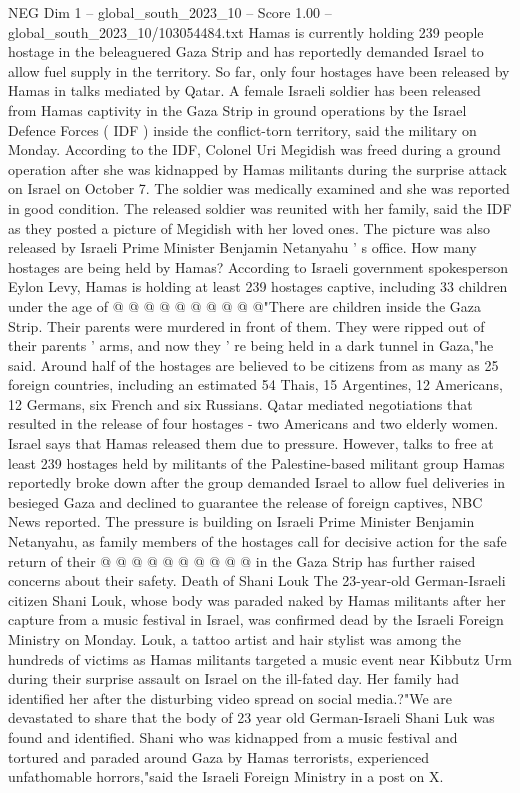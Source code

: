 \begin{textsample}{NEG Dim 1 – global\_south\_2023\_10 – Score 1.00 – global\_south\_2023\_10/103054484.txt}  \label{ex:f1_neg_398}
Hamas is currently holding 239 people hostage in the beleaguered Gaza Strip and has reportedly demanded Israel to allow fuel supply in the territory.
So far, only four hostages have been released by Hamas in talks mediated by Qatar.
A female Israeli soldier has been released from Hamas captivity in the Gaza Strip in ground operations by the Israel Defence Forces ( IDF ) inside the conflict-torn territory, said the military on Monday.
According to the IDF, Colonel Uri Megidish was freed during a ground operation after she was kidnapped by Hamas militants during the surprise attack on Israel on October 7.
The soldier was medically examined and she was reported in good condition.
The released soldier was reunited with her family, said the IDF as they posted a picture of Megidish with her loved ones.
The picture was also released by Israeli Prime Minister Benjamin Netanyahu ' s office.
How many hostages are being held by Hamas?
According to Israeli government spokesperson Eylon Levy, Hamas is holding at least 239 hostages captive, including 33 children under the age of @ @ @ @ @ @ @ @ @ @"There are children inside the Gaza Strip.
Their parents were murdered in front of them.
They were ripped out of their parents ' arms, and now they ' re being held in a dark tunnel in Gaza,"he said.
Around half of the hostages are believed to be citizens from as many as 25 foreign countries, including an estimated 54 Thais, 15 Argentines, 12 Americans, 12 Germans, six French and six Russians.
Qatar mediated negotiations that resulted in the release of four hostages - two Americans and two elderly women.
Israel says that Hamas released them due to pressure.
However, talks to free at least 239 hostages held by militants of the Palestine-based militant group Hamas reportedly broke down after the group demanded Israel to allow fuel deliveries in besieged Gaza and declined to guarantee the release of foreign captives, NBC News reported.
The pressure is building on Israeli Prime Minister Benjamin Netanyahu, as family members of the hostages call for decisive action for the safe return of their @ @ @ @ @ @ @ @ @ @ in the Gaza Strip has further raised concerns about their safety.
Death of Shani Louk The 23-year-old German-Israeli citizen Shani Louk, whose body was paraded naked by Hamas militants after her capture from a music festival in Israel, was confirmed dead by the Israeli Foreign Ministry on Monday.
Louk, a tattoo artist and hair stylist was among the hundreds of victims as Hamas militants targeted a music event near Kibbutz Urm during their surprise assault on Israel on the ill-fated day.
Her family had identified her after the disturbing video spread on social media.?"We are devastated to share that the body of 23 year old German-Israeli Shani Luk was found and identified.
Shani who was kidnapped from a music festival and tortured and paraded around Gaza by Hamas terrorists, experienced unfathomable horrors,"said the Israeli Foreign Ministry in a post on X.

\end{textsample}
